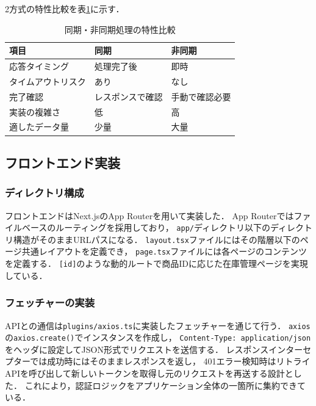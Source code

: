 \documentclass[submit,techrep]{ipsj}
\begin{document}
2方式の特性比較を表\ref{tab:csv-compare}に示す．

\begin{table}[H]
  \caption{同期・非同期処理の特性比較}
  \label{tab:csv-compare}
  \vspace{2mm}
  \centering
  \small
  \begin{tabular}{lll}
    \hline\hline
    \textbf{項目}       & \textbf{同期} & \textbf{非同期} \\
    \hline
    応答タイミング      & 処理完了後    & 即時 \\
    タイムアウトリスク  & あり          & なし \\
    完了確認            & レスポンスで確認 & 手動で確認必要 \\
    実装の複雑さ        & 低            & 高 \\
    適したデータ量      & 少量          & 大量 \\
    \hline
  \end{tabular}
\end{table}

\subsection{フロントエンド実装}

\subsubsection{ディレクトリ構成}

フロントエンドはNext.jsのApp Router\cite{nextjs-approuter}を用いて実装した．
App Routerではファイルベースのルーティングを採用しており，
\texttt{app/}ディレクトリ以下のディレクトリ構造がそのままURLパスになる．
\texttt{layout.tsx}ファイルにはその階層以下のページ共通レイアウトを定義でき，
\texttt{page.tsx}ファイルには各ページのコンテンツを定義する．
\texttt{[id]}のような動的ルートで商品IDに応じた在庫管理ページを実現している．

\subsubsection{フェッチャーの実装}

APIとの通信は\texttt{plugins/axios.ts}に実装したフェッチャーを通じて行う．
\texttt{axios}\cite{axios-docs}の\texttt{axios.create()}でインスタンスを作成し，
\texttt{Content-Type: application/json}をヘッダに設定してJSON形式でリクエストを送信する．
レスポンスインターセプターでは成功時にはそのままレスポンスを返し，
401エラー検知時はリトライAPIを呼び出して新しいトークンを取得し元のリクエストを再送する設計とした．
これにより，認証ロジックをアプリケーション全体の一箇所に集約できている．
\end{document}
